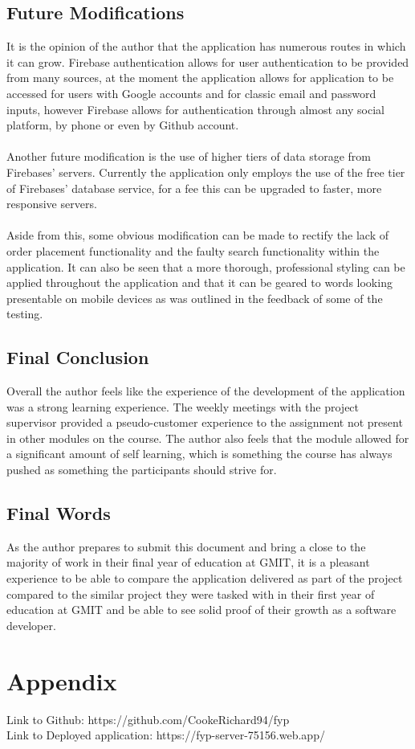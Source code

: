 \section{Future Modifications}
It is the opinion of the author that the application has numerous routes in which it can grow. Firebase authentication allows for user authentication to be provided from many sources, at the moment the application allows for application to be accessed for users with Google accounts and for classic email and password inputs, however Firebase allows for authentication through almost any social platform, by phone or even by Github account. \\ \\
Another future modification is the use of higher tiers of data storage from Firebases' servers. Currently the application only employs the use of the free tier of Firebases' database service, for a fee this can be upgraded to faster, more responsive servers. \\ \\
Aside from this, some obvious modification can be made to rectify the lack of order placement functionality and the faulty search functionality within the application. It can also be seen that a more thorough, professional styling can be applied throughout the application and that it can be geared to words looking presentable on mobile devices as was outlined in the feedback of some of the testing. 

\section{Final Conclusion}
Overall the author feels like the experience of the development of the application was a strong learning experience. The weekly meetings with the project supervisor provided a pseudo-customer experience to the assignment not present in other modules on the course. The author also feels that the module allowed for a significant amount of self learning, which is something the course has always pushed as something the participants should strive for.

\section{Final Words}
As the author prepares to submit this document and bring a close to the majority of work in their final year of education at GMIT, it is a pleasant experience to be able to compare the application delivered as part of the project compared to the similar project they were tasked with in their first year of education at GMIT and be able to see solid proof of their growth as a software developer.

\chapter{Appendix}

Link to Github: https://github.com/CookeRichard94/fyp \\
Link to Deployed application: https://fyp-server-75156.web.app/ 



















